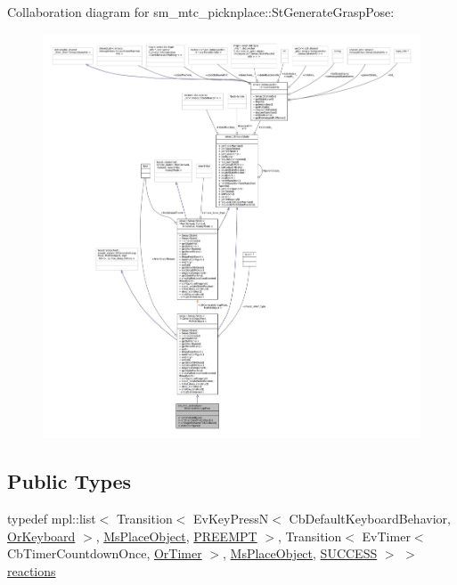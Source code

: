 Collaboration diagram for sm\+\_\+mtc\+\_\+picknplace\+:\+:St\+Generate\+Grasp\+Pose\+:
\nopagebreak
\begin{figure}[H]
\begin{center}
\leavevmode
\includegraphics[width=350pt]{structsm__mtc__picknplace_1_1StGenerateGraspPose__coll__graph}
\end{center}
\end{figure}
\subsection*{Public Types}
\begin{DoxyCompactItemize}
\item 
typedef mpl\+::list$<$ Transition$<$ Ev\+Key\+PressN$<$ Cb\+Default\+Keyboard\+Behavior, \hyperlink{classsm__mtc__picknplace_1_1OrKeyboard}{Or\+Keyboard} $>$, \hyperlink{classsm__mtc__picknplace_1_1MsPlaceObject}{Ms\+Place\+Object}, \hyperlink{classPREEMPT}{P\+R\+E\+E\+M\+PT} $>$, Transition$<$ Ev\+Timer$<$ Cb\+Timer\+Countdown\+Once, \hyperlink{classsm__mtc__picknplace_1_1OrTimer}{Or\+Timer} $>$, \hyperlink{classsm__mtc__picknplace_1_1MsPlaceObject}{Ms\+Place\+Object}, \hyperlink{classSUCCESS}{S\+U\+C\+C\+E\+SS} $>$ $>$ \hyperlink{structsm__mtc__picknplace_1_1StGenerateGraspPose_af9b6e634fea582e30f5da61ad59d50b4}{reactions}
\end{DoxyCompactItemize}

